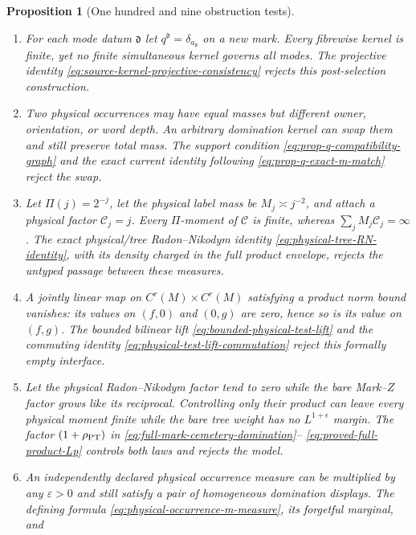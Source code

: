 \documentclass[11pt]{article}
\newtheorem{proposition}[theorem]{Proposition}
\begin{document}
\begin{proposition}[One hundred and nine obstruction tests]
\begin{enumerate}[label=\textup{(T\arabic*)}]
      one in every row.  All coordinates exist separately but the tuple is
      not a bounded product test.  The uniform lift
      \eqref{eq:bounded-physical-test-lift} rejects this model.
\item For each mode datum $\mathfrak d$ let
      $q^{\mathfrak d}=\delta_{a_{\mathfrak d}}$ on a new mark.  Every
      fibrewise kernel is finite, yet no finite simultaneous kernel governs
      all modes.  The projective identity
      \eqref{eq:source-kernel-projective-consistency} rejects this
      post-selection construction.
\item Two physical occurrences may have equal masses but different owner,
      orientation, or word depth.  An arbitrary domination kernel can swap
      them and still preserve total mass.  The support condition
      \eqref{eq:prop-q-compatibility-graph} and the exact current identity
      following \eqref{eq:prop-q-exact-m-match} reject the swap.
\item Let $\Pi(j)=2^{-j}$, let the physical label mass be
      $M_j\asymp j^{-2}$, and attach a physical factor $\mathcal C_j=j$.
      Every $\Pi$-moment of $\mathcal C$ is finite, whereas
      $\sum_jM_j\mathcal C_j=\infty$.  The exact physical/tree
      Radon--Nikodym identity \eqref{eq:physical-tree-RN-identity}, with its
      density charged in the full product envelope, rejects the untyped
      passage between these measures.
\item A jointly linear map on
      $C^r(M)\times C^r(M)$ satisfying a product norm bound vanishes: its
      values on $(f,0)$ and $(0,g)$ are zero, hence so is its value on
      $(f,g)$.  The bounded \emph{bilinear} lift
      \eqref{eq:bounded-physical-test-lift} and the commuting identity
      \eqref{eq:physical-test-lift-commutation} reject this formally empty
      interface.
\item Let the physical Radon--Nikodym factor tend to zero while the bare
      Mark--$Z$ factor grows like its reciprocal.  Controlling only their
      product can leave every physical moment finite while the bare tree
      weight has no $L^{1+\epsilon}$ margin.  The factor
      $(1+\rho_{\rm PT})$ in
      \eqref{eq:full-mark-cemetery-domination}--
      \eqref{eq:proved-full-product-Lp} controls both laws and rejects the
      model.
\item An independently declared physical occurrence measure can be
      multiplied by any $\varepsilon>0$ and still satisfy a pair of
      homogeneous domination displays.  The defining formula
      \eqref{eq:physical-occurrence-m-measure}, its forgetful marginal, and

\end{enumerate}
\end{proposition}
\end{document}
